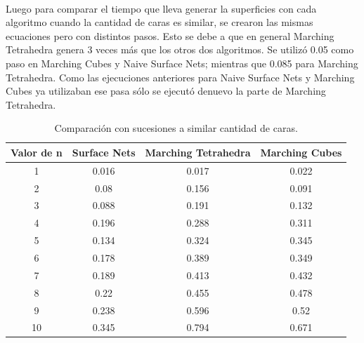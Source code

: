 \documentclass[12pt]{article}
\begin{document}
\\Luego para comparar el tiempo que lleva generar la superficies con cada algoritmo cuando la cantidad de caras es similar, se crearon las mismas ecuaciones pero con distintos pasos. Esto se debe a que en general Marching Tetrahedra genera 3 veces más que los otros dos algoritmos. Se utilizó 0.05 como paso en Marching Cubes y Naive Surface Nets; mientras que 0.085 para Marching Tetrahedra. Como las ejecuciones anteriores para Naive Surface Nets y Marching Cubes ya utilizaban ese pasa sólo se ejecutó denuevo la parte de Marching Tetrahedra.
\begin{table}[h!]
  \centering
  \label{tab:table1}
  \begin{tabular}{cccc}
    \toprule
    Valor de n & Surface Nets & Marching Tetrahedra & Marching Cubes\\
    \midrule
    1 & 0.016 & 0.017 & 0.022\\
    2 & 0.08 & 0.156 & 0.091\\
    3 & 0.088 & 0.191 & 0.132\\
    4 & 0.196 & 0.288 & 0.311\\
    5 & 0.134 & 0.324 & 0.345\\
    6 & 0.178 & 0.389 & 0.349\\
    7 & 0.189 & 0.413 & 0.432\\
    8 & 0.22 & 0.455 & 0.478\\
    9 & 0.238 & 0.596 & 0.52\\
    10 & 0.345 & 0.794 & 0.671\\
    \bottomrule
  \end{tabular}
  \caption{Comparación con sucesiones a similar cantidad de caras.}
\end{table}
\clearpage
\end{document}

